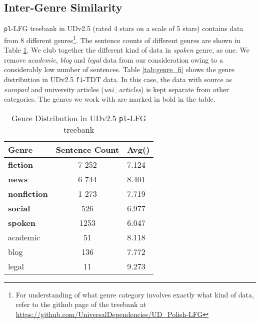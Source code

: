 \subsection{Inter-Genre Similarity}

\verb|pl|-LFG treebank in UDv2.5 (rated 4 stars on a scale of 5 stars) contains data from 8 different genres\footnote{For understanding of what genre category involves exactly what kind of data, refer to the github page of the treebank at \url{https://github.com/UniversalDependencies/UD_Polish-LFG}}. The sentence counts of different genres are shown in Table \ref{tab:genre_pl}. We club together the different kind of data in \textit{spoken} genre, as one. We remove \textit{academic}, \textit{blog} and \textit{legal} data from our consideration owing to a considerably low number of sentences. Table \ref{tab:genre_fi} shows the genre distribution in UDv2.5 \texttt{fi}-TDT data. In this case, the data with source as \textit{europarl} and university articles (\textit{uni\_articles}) is kept separate from other categories. The genres we work with are marked in bold in the table. 

\begin{table}[H]
    \centering
    \begin{tabular}{|l|c|l|}
        \hline
        \textbf{Genre} & \textbf{Sentence Count} & \textbf{Avg()}\\
        \hline
        \hline
        \textbf{fiction} & 7 252 & 7.124 \\
        \textbf{news} & 6 744 & 8.401\\
        \textbf{nonfiction} & 1 273 & 7.719\\
        \textbf{social} & 526 & 6.977\\
        \textbf{spoken} & 1253 & 6.047\\
        academic & 51 & 8.118\\
        blog & 136 & 7.772\\
        legal & 11 & 9.273\\ 
        \hline
    \end{tabular}
    \caption{Genre Distribution in UDv2.5 \texttt{pl}-LFG treebank}
    \label{tab:genre_pl}
\end{table}

